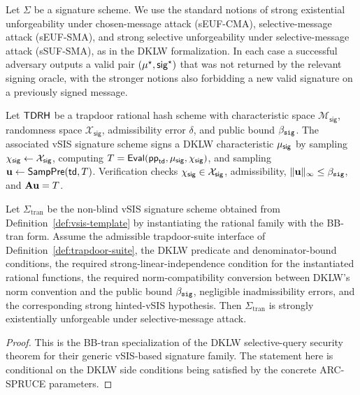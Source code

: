 \begin{definition}\label{def:seuf-defs}
Let \(\Sigma\) be a signature scheme.  We use the standard notions of strong existential unforgeability under
chosen-message attack (sEUF-CMA), selective-message attack (sEUF-SMA), and strong selective unforgeability under
selective-message attack (sSUF-SMA), as in the DKLW formalization.  In each case a successful adversary outputs a
valid pair \((\mu^\star,\mathsf{sig}^\star)\) that was not returned by the relevant signing oracle, with the stronger notions
also forbidding a new valid signature on a previously signed message.
\end{definition}

\begin{definition}\label{def:vsis-template}
Let \(\mathsf{TDRH}\) be a trapdoor rational hash scheme with characteristic space \(\mathcal M_{\mathsf{sig}}\), randomness
space \(\mathcal X_{\mathsf{sig}}\), admissibility error \(\delta\), and public bound \(\beta_{\mathtt{sig}}\).  The associated
vSIS signature scheme signs a DKLW characteristic \(\mu_{\mathsf{sig}}\) by sampling \(\chi_{\mathsf{sig}}\leftarrow\mathcal X_{\mathsf{sig}}\),
computing \(T=\mathsf{Eval}(\mathsf{pp}_{\mathsf{td}},\mu_{\mathsf{sig}},\chi_{\mathsf{sig}})\), and sampling
\(\mathbf{u}\gets\mathsf{SampPre}(\mathsf{td},T)\).  Verification checks \(\chi_{\mathsf{sig}}\in\mathcal X_{\mathsf{sig}}\), admissibility,
\(\|\mathbf{u}\|_\infty\le\beta_{\mathtt{sig}}\), and \(\mathbf{A}\mathbf{u}=T\).
\end{definition}

\begin{theorem}\label{thm:dkwl-seuf-sma}
Let \(\Sigma_{\mathrm{tran}}\) be the non-blind vSIS signature scheme obtained from Definition~\ref{def:vsis-template}
by instantiating the rational family with the BB-tran form.  Assume the admissible trapdoor-suite interface of
Definition~\ref{def:trapdoor-suite}, the DKLW predicate and denominator-bound conditions, the required
strong-linear-independence condition for the instantiated rational functions, the required norm-compatibility
conversion between DKLW's norm convention and the public bound \(\beta_{\mathtt{sig}}\), negligible inadmissibility errors,
and the corresponding strong hinted-vSIS hypothesis.  Then \(\Sigma_{\mathrm{tran}}\) is strongly existentially
unforgeable under selective-message attack.
\end{theorem}

\begin{proof}
This is the BB-tran specialization of the DKLW selective-query security theorem for their generic vSIS-based
signature family.  The statement here is conditional on the DKLW side conditions being satisfied by the concrete
ARC-SPRUCE parameters.
\end{proof}

